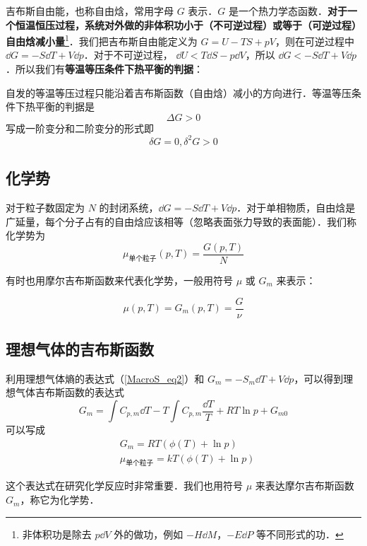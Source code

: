 

吉布斯自由能，也称自由焓，常用字母 $G$ 表示．$G$ 是一个热力学态函数．\textbf{对于一个恒温恒压过程，系统对外做的非体积功小于（不可逆过程）或等于（可逆过程）自由焓减小量}\footnote{非体积功是除去 $p\dd V$ 外的做功，例如 $-H\dd M$，$-E\dd P$ 等不同形式的功．}．我们把吉布斯自由能定义为 $G=U-TS+pV$，则在可逆过程中 $\dd G= -S\dd T+V\dd p$．对于不可逆过程， $\dd U<T\dd S-p\dd V$，所以 $\dd G<-S\dd T+V\dd p$．所以我们有\textbf{等温等压条件下热平衡的判据}：

自发的等温等压过程只能沿着吉布斯函数（自由焓）减小的方向进行．等温等压条件下热平衡的判据是
\begin{equation}
\Delta G>0
\end{equation}
写成一阶变分和二阶变分的形式即
\begin{equation}\label{GibbsG_eq2}
\delta G=0,\delta^2 G>0
\end{equation}

\subsection{化学势}

对于粒子数固定为 $N$ 的封闭系统，$\dd G=-S\dd T+V\dd p$．对于单相物质，自由焓是广延量，每个分子占有的自由焓应该相等（忽略表面张力导致的表面能）．我们称化学势为
\begin{equation}
\mu_{\text{单个粒子}}(p,T)=\frac{G(p,T)}{N}
\end{equation}

有时也用摩尔吉布斯函数来代表化学势，一般用符号 $\mu$ 或 $G_m$ 来表示：

\begin{equation}\label{GibbsG_eq1}
\mu(p,T)=G_m(p,T)=\frac{G}{\nu}
\end{equation}

\subsection{理想气体的吉布斯函数}
利用理想气体熵的表达式（\autoref{MacroS_eq2}）和 $G_m=-S_m\dd T+V\dd p$，可以得到理想气体吉布斯函数的表达式
\begin{equation}
G_m=\int C_{p,m} \dd T - T\int C_{p,m} \frac{\dd T}{T}+RT\ln p+G_{m0}
\end{equation}
可以写成
\begin{equation}\label{GibbsG_eq3}
\begin{aligned}
&G_m=RT(\phi(T)+\ln p)\\
&\mu_{\text{单个粒子}} = kT(\phi(T)+\ln p)
\end{aligned}
\end{equation}

这个表达式在研究化学反应时非常重要．我们也用符号 $\mu$ 来表达摩尔吉布斯函数 $G_m$，称它为化学势．